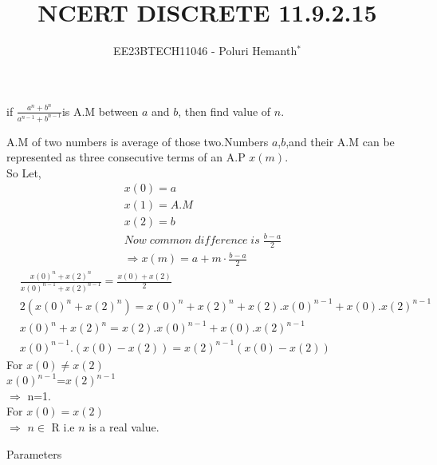 \documentclass[journal,12pt,twocolumn]{IEEEtran}
\theoremstyle{remark}
\begin{document}

\vspace{3cm}


\title{NCERT DISCRETE 11.9.2.15}
\author{EE23BTECH11046 - Poluri Hemanth$^{*}$}



if \( \frac{a^n +b^n}{a^{n-1} + b^{n-1}}\)is A.M between $a$ and $b$, then find value of $n$.
\break

A.M of two numbers is average of those two.Numbers $a$,$b$,and their A.M can be represented as three consecutive terms of an A.P  $x(m)$.\\
 So Let,
 \begin{align}
	 &x(0)=a&&\\
	 &x(1)=A.M&& \\
	 &x(2)=b&&\\
	 &Now\;common\;difference \;is\;\frac{b-a}{2}&&\\
	 &\Rightarrow x(m)=a+m\cdot\frac{b-a}{2}&&
\end{align}
\begin{align}
	 &\frac{x(0)^n +x(2)^n}{x(0)^{n-1} + x(2)^{n-1}}= \frac{x(0)+x(2)}{2} && \\
	 &2(x(0)^n +x(2)^n) = x(0)^n +x(2)^n +x(2).x(0)^{n-1}+x(0).x(2)^{n-1} &&\\
	 &x(0)^n +x(2)^n = x(2).x(0)^{n-1}+x(0).x(2)^{n-1}&& \\
	 &x(0)^{n-1}.(x(0)-x(2))=x(2)^{n-1}(x(0)-x(2))&&
 \end{align}
 For $x(0) \neq x(2)$ \\
 $x(0)^{n-1}$=$x(2)^{n-1}$ \\
 $\Rightarrow$ n=1.\\
  For $x(0)=x(2)$\\
$\Rightarrow$ $n\in$ R  i.e $n$ is a real value.\newline
\begin{table}[h!]
    
    \caption{Parameters}
    \label{tab:11.9.2.15}
\end{table}
\end{document}
